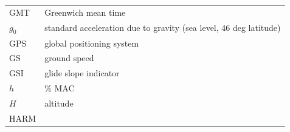 \documentclass[
]{book}
\begin{document}
\begin{longtable}[]{@{}ll@{}}
\begin{minipage}[t]{0.47\columnwidth}\raggedright
GMT\strut
\end{minipage} & \begin{minipage}[t]{0.47\columnwidth}\raggedright
Greenwich mean time\strut
\end{minipage}\tabularnewline
\begin{minipage}[t]{0.47\columnwidth}\raggedright
\(g_0\)\strut
\end{minipage} & \begin{minipage}[t]{0.47\columnwidth}\raggedright
standard acceleration due to gravity (sea level, 46 deg latitude)\strut
\end{minipage}\tabularnewline
\begin{minipage}[t]{0.47\columnwidth}\raggedright
GPS\strut
\end{minipage} & \begin{minipage}[t]{0.47\columnwidth}\raggedright
global positioning system\strut
\end{minipage}\tabularnewline
\begin{minipage}[t]{0.47\columnwidth}\raggedright
GS\strut
\end{minipage} & \begin{minipage}[t]{0.47\columnwidth}\raggedright
ground speed\strut
\end{minipage}\tabularnewline
\begin{minipage}[t]{0.47\columnwidth}\raggedright
GSI\strut
\end{minipage} & \begin{minipage}[t]{0.47\columnwidth}\raggedright
glide slope indicator\strut
\end{minipage}\tabularnewline
\begin{minipage}[t]{0.47\columnwidth}\raggedright
\(h\)\strut
\end{minipage} & \begin{minipage}[t]{0.47\columnwidth}\raggedright
\% MAC\strut
\end{minipage}\tabularnewline
\begin{minipage}[t]{0.47\columnwidth}\raggedright
\(H\)\strut
\end{minipage} & \begin{minipage}[t]{0.47\columnwidth}\raggedright
altitude\strut
\end{minipage}\tabularnewline
\begin{minipage}[t]{0.47\columnwidth}\raggedright
HARM\strut
\end{minipage} & \begin{minipage}[t]{0.47\columnwidth}\raggedright

\end{minipage}
\end{longtable}
\end{document}
